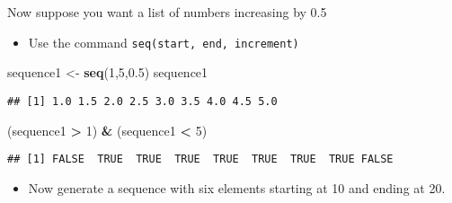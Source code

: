 \documentclass[ignorenonframetext,]{beamer}
\newenvironment{Shaded}{\begin{snugshade}}{\end{snugshade}}
\newcommand{\KeywordTok}[1]{\textcolor[rgb]{0.13,0.29,0.53}{\textbf{#1}}}
\newcommand{\DecValTok}[1]{\textcolor[rgb]{0.00,0.00,0.81}{#1}}
\newcommand{\FloatTok}[1]{\textcolor[rgb]{0.00,0.00,0.81}{#1}}
\newcommand{\StringTok}[1]{\textcolor[rgb]{0.31,0.60,0.02}{#1}}
\newcommand{\OperatorTok}[1]{\textcolor[rgb]{0.81,0.36,0.00}{\textbf{#1}}}
\newcommand{\NormalTok}[1]{#1}
\providecommand{\tightlist}{%
	\setlength{\itemsep}{0pt}\setlength{\parskip}{0pt}}
\begin{document}
\begin{frame}[fragile]{Now suppose you want a list of numbers increasing
by 0.5}

\begin{itemize}
\tightlist
\item
  Use the command \texttt{seq(start,\ end,\ increment)}
\end{itemize}

\begin{Shaded}
\begin{Highlighting}[]
\NormalTok{sequence1 <-}\StringTok{ }\KeywordTok{seq}\NormalTok{(}\DecValTok{1}\NormalTok{,}\DecValTok{5}\NormalTok{,}\FloatTok{0.5}\NormalTok{)}
\NormalTok{sequence1}
\end{Highlighting}
\end{Shaded}

\begin{verbatim}
## [1] 1.0 1.5 2.0 2.5 3.0 3.5 4.0 4.5 5.0
\end{verbatim}

\begin{Shaded}
\begin{Highlighting}[]
\NormalTok{(sequence1 }\OperatorTok{>}\StringTok{ }\DecValTok{1}\NormalTok{) }\OperatorTok{&}\StringTok{ }\NormalTok{(sequence1 }\OperatorTok{<}\StringTok{ }\DecValTok{5}\NormalTok{)}
\end{Highlighting}
\end{Shaded}

\begin{verbatim}
## [1] FALSE  TRUE  TRUE  TRUE  TRUE  TRUE  TRUE  TRUE FALSE
\end{verbatim}

\begin{itemize}
\tightlist
\item
 Now generate a sequence with six elements starting at
  10 and ending at 20.
\end{itemize}

\end{frame}
\end{document}
